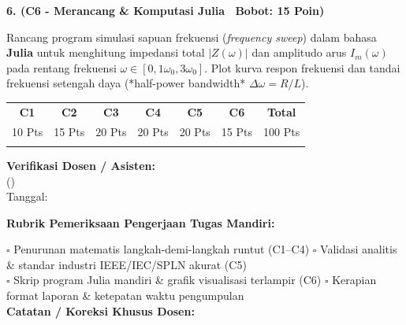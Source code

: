 \documentclass[10pt,a4paper]{article}
\begin{document}
\vspace{3.5mm}

\noindent\textbf{6. (C6 - Merancang \& Komputasi Julia \textbar\ Bobot: 15 Poin)}\par\vspace{0.8mm}
{\footnotesize Rancang program simulasi sapuan frekuensi (\textit{frequency sweep}) dalam bahasa \textbf{Julia} untuk menghitung impedansi total $|Z(\omega)|$ dan amplitudo arus $I_m(\omega)$ pada rentang frekuensi $\omega \in [0{,}1\omega_0, 3\omega_0]$. Plot kurva respon frekuensi dan tandai frekuensi setengah daya (*half-power bandwidth* $\Delta\omega = R/L$).}\par

\vfill

\noindent\begin{minipage}[b]{0.62\textwidth}%
  \centering
  \scriptsize
  \begin{tabular}{|c|c|c|c|c|c|c|}
    \hline
    \rowcolor{unibblue}
    \textbf{\color{white}C1} & \textbf{\color{white}C2} & \textbf{\color{white}C3} & \textbf{\color{white}C4} & \textbf{\color{white}C5} & \textbf{\color{white}C6} & \textbf{\color{white}Total} \\
    \rowcolor{unibblue!10}
    10 Pts & 15 Pts & 20 Pts & 20 Pts & 20 Pts & 15 Pts & 100 Pts \\
    \hline
    & & & & & & \\[3mm]
    \hline
  \end{tabular}%
\end{minipage}%
\hfill%
\begin{minipage}[b]{0.35\textwidth}%
  \centering
  \scriptsize
  \textbf{Verifikasi Dosen / Asisten:}\\[6mm]
  (\dotfill)\\[1mm]
  \tiny Tanggal: \dotfill
\end{minipage}\par

\vspace{2mm}
\begin{tcolorbox}[colback=white,colframe=unibblue!40!black,colbacktitle=unibblue!10,coltitle=unibblue,boxrule=0.5pt,arc=2pt,left=5pt,right=5pt,top=3pt,bottom=3pt,title=\textbf{\tiny Catatan Evaluasi \& Umpan Balik Dosen Pengampu}]
  \tiny
  \textbf{Rubrik Pemeriksaan Pengerjaan Tugas Mandiri:}\par\vspace{0.8mm}
  $\square$ Penurunan matematis langkah-demi-langkah runtut (C1--C4) \hfill $\square$ Validasi analitis \& standar industri IEEE/IEC/SPLN akurat (C5)\\[0.8mm]
  $\square$ Skrip program Julia mandiri \& grafik visualisasi terlampir (C6) \hfill $\square$ Kerapian format laporan \& ketepatan waktu pengumpulan\\[2.0mm]
  \textbf{Catatan / Koreksi Khusus Dosen:}\\[1.6cm]
\end{tcolorbox}
\end{document}
